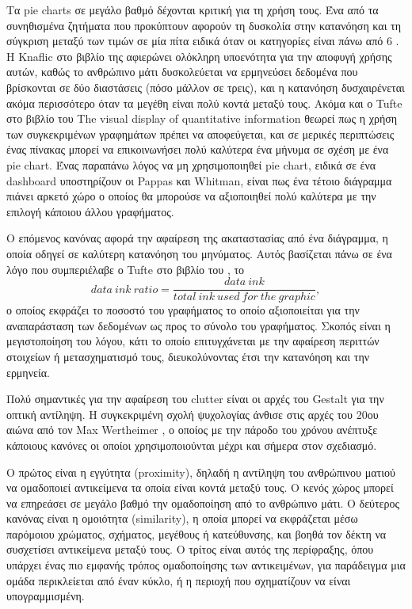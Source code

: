 \documentclass{article}
\begin{document}
Τα pie charts σε μεγάλο βαθμό δέχονται κριτική για τη χρήση τους. Ένα από τα συνηθισμένα ζητήματα που προκύπτουν αφορούν τη δυσκολία στην κατανόηση και τη σύγκριση μεταξύ των τιμών σε μία πίτα ειδικά όταν οι κατηγορίες είναι πάνω από 6 \cite{annesley2010bars}. Η Knaflic στο βιβλίο της αφιερώνει ολόκληρη υποενότητα για την αποφυγή χρήσης αυτών, καθώς το ανθρώπινο μάτι δυσκολεύεται να ερμηνεύσει δεδομένα που βρίσκονται σε δύο διαστάσεις (πόσο μάλλον σε τρεις), και η κατανόηση δυσχαιρένεται ακόμα περισσότερο όταν τα μεγέθη είναι πολύ κοντά μεταξύ τους. \cite{knaflic2015storytelling} Ακόμα και ο Tufte στο βιβλίο του The visual display of quantitative information θεωρεί πως η χρήση των συγκεκριμένων γραφημάτων πρέπει να αποφεύγεται, και σε μερικές περιπτώσεις ένας πίνακας μπορεί να επικοινωνήσει πολύ καλύτερα ένα μήνυμα σε σχέση με ένα pie chart. \cite{tufte2001visual} Ένας παραπάνω λόγος να μη χρησιμοποιηθεί pie chart, ειδικά σε ένα dashboard υποστηρίζουν οι Pappas και Whitman, είναι πως ένα τέτοιο διάγραμμα πιάνει αρκετό χώρο ο οποίος θα μπορούσε να αξιοποιηθεί πολύ καλύτερα με την επιλογή κάποιου άλλου γραφήματος. \cite{pappas2011riding}

Ο επόμενος κανόνας αφορά την αφαίρεση της ακαταστασίας από ένα διάγραμμα, η οποία οδηγεί σε καλύτερη κατανόηση του μηνύματος. Αυτός βασίζεται πάνω σε ένα λόγο που συμπεριέλαβε ο Tufte στο βιβλίο του \cite{tufte2001visual}, το \[ data \ ink \ ratio = \frac{data \ ink}{total \ ink \ used \ for \ the \ graphic},\] ο οποίος εκφράζει το ποσοστό του γραφήματος το οποίο αξιοποιείται για την αναπαράσταση των δεδομένων ως προς το σύνολο του γραφήματος. Σκοπός είναι η μεγιστοποίηση του λόγου, κάτι το οποίο επιτυγχάνεται με την αφαίρεση περιττών στοιχείων ή μετασχηματισμό τους, διευκολύνοντας έτσι την κατανόηση και την ερμηνεία. \cite{knaflic2015storytelling}

Πολύ σημαντικές για την αφαίρεση του clutter είναι οι αρχές του Gestalt για την οπτική αντίληψη. Η συγκεκριμένη σχολή ψυχολογίας άνθισε στις αρχές του 20ου αιώνα από τον Max Wertheimer \cite{wagemans2012century1, wagemans2012century2}, ο οποίος με την πάροδο του χρόνου ανέπτυξε κάποιους κανόνες οι οποίοι χρησιμοποιούνται μέχρι και σήμερα στον σχεδιασμό. 

Ο πρώτος είναι η εγγύτητα (proximity), δηλαδή η αντίληψη του ανθρώπινου ματιού να ομαδοποιεί αντικείμενα τα οποία είναι κοντά μεταξύ τους. Ο κενός χώρος μπορεί να επηρεάσει σε μεγάλο βαθμό την ομαδοποίηση από το ανθρώπινο μάτι. Ο δεύτερος κανόνας είναι η ομοιότητα (similarity), η οποία μπορεί να εκφράζεται μέσω παρόμοιου χρώματος, σχήματος, μεγέθους ή κατεύθυνσης, και βοηθά τον δέκτη να συσχετίσει αντικείμενα μεταξύ τους. Ο τρίτος είναι αυτός της περίφραξης, όπου υπάρχει ένας πιο εμφανής τρόπος ομαδοποίησης των αντικειμένων, για παράδειγμα μια ομάδα περικλείεται από έναν κύκλο, ή η περιοχή που σχηματίζουν να είναι υπογραμμισμένη. \cite{knaflic2015storytelling, wagemans2012century1}
\end{document}
